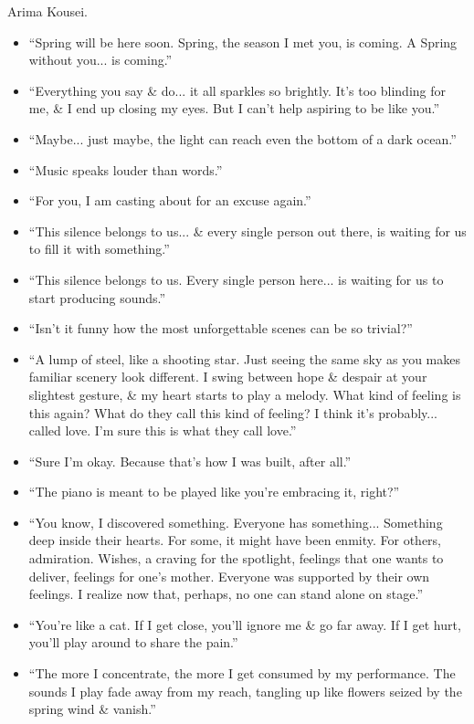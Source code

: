 \documentclass{article}
\begin{document}
\begin{enumerate}
    {\sf Arima Kousei.}
    \begin{itemize}
    	\item ``Spring will be here soon. Spring, the season I met you, is coming. A Spring without you... is coming.''
    	\item ``Everything you say \& do... it all sparkles so brightly. It's too blinding for me, \& I end up closing my eyes. But I can't help aspiring to be like you.''
    	\item ``Maybe... just maybe, the light can reach even the bottom of a dark ocean.''
    	\item ``Music speaks louder than words.''
    	\item ``For you, I am casting about for an excuse again.''
    	\item ``This silence belongs to us... \& every single person out there, is waiting for us to fill it with something.''
    	\item ``This silence belongs to us. Every single person here... is waiting for us to start producing sounds.''
    	\item ``Isn't it funny how the most unforgettable scenes can be so trivial?''
    	\item ``A lump of steel, like a shooting star. Just seeing the same sky as you makes familiar scenery look different. I swing between hope \& despair at your slightest gesture, \& my heart starts to play a melody. What kind of feeling is this again? What do they call this kind of feeling? I think it's probably... called love. I'm sure this is what they call love.''
    	\item ``Sure I'm okay. Because that's how I was built, after all.''
    	\item ``The piano is meant to be played like you're embracing it, right?''
    	\item ``You know, I discovered something. Everyone has something... Something deep inside their hearts. For some, it might have been enmity. For others, admiration. Wishes, a craving for the spotlight, feelings that one wants to deliver, feelings for one's mother. Everyone was supported by their own feelings. I realize now that, perhaps, no one can stand alone on stage.''
    	\item ``You're like a cat. If I get close, you'll ignore me \& go far away. If I get hurt, you'll play around to share the pain.''
    	\item ``The more I concentrate, the more I get consumed by my performance. The sounds I play fade away from my reach, tangling up like flowers seized by the spring wind \& vanish.''

\end{itemize}
\end{enumerate}
\end{document}
